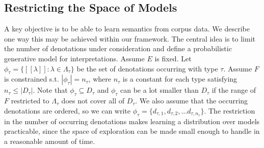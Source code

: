 \documentclass[manuscript]{clv2}
\newcommand{\interp}[1]{[\![ #1 ]\!]}
\begin{document}



 
\subsection{Restricting the Space of Models}
\label{section:distributions}

A key objective is to be able to learn semantics from corpus data.  We describe one way this may be achieved within our
framework. The central idea is to limit the number of denotations
under consideration and define a probabilistic generative model for
interpretations. Assume $E$ is fixed. Let
$\phi_\tau = \{\interp{\lambda} : \lambda\in \Lambda_\tau\}$ be the
set of denotations occurring with type $\tau$. Assume $F$ is
constrained s.t. $|\phi_\tau| = n_\tau$, where $n_\tau$ is a
constant for each type satisfying $n_\tau \le |D_\tau|$. Note that
$\phi_\tau \subseteq D_\tau$ and $\phi_\tau$ can be a lot smaller
than $D_\tau$ if the range of $F$ restricted to $\Lambda_\tau$ does
not cover all of $D_\tau$.  We also assume that the occurring
denotations are ordered, so we can write $\phi_\tau =
\{d_{\tau,1}, d_{\tau,2}, \ldots d_{\tau, n_\tau}\}$.
The restriction in the number of occurring denotations makes learning
a distribution over models practicable, since the space of exploration
can be made small enough to handle in a reasonable amount of time.
\end{document}
